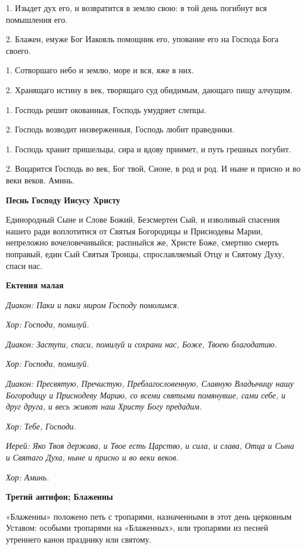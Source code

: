 1. Изыдет дух его, и возвратится в землю свою: в той день погибнут вся помышления его. 


2. Блажен, емуже Бог Иаковль помощник его, упование его на Господа Бога своего. 


1. Сотворшаго небо и землю, море и вся, яже в них. 


2. Хранящаго истину в век, творящаго суд обидимым, дающаго пищу алчущим. 


1. Господь решит окованныя, Господь умудряет слепцы. 


2. Господь возводит низверженныя, Господь любит праведники. 


1. Господь хранит пришельцы, сира и вдову приимет, и путь грешных погубит. 


2. Воцарится Господь во век, Бог твой, Сионе, в род и род. И ныне и присно и во веки веков. Аминь. 


\medskip
\bfseries Песнь Господу Иисусу Христу \normalfont{}


Единородный Сыне и Слове Божий, Безсмертен Сый, и изволивый спасения нашего ради воплотитися от Святыя Богородицы и Приснодевы Марии, непреложно вочеловечивыйся; распныйся же, Христе Боже, смертию смерть поправый, един Сый Святыя Троицы, спрославляемый Отцу и Святому Духу, спаси нас. 


\medskip
\bfseries Ектения малая \normalfont{}


\itshape Диакон:\normalfont{} Паки и паки миром Господу помолимся. 


\itshape Хор:\normalfont{} Господи, помилуй. 


\itshape Диакон:\normalfont{} Заступи, спаси, помилуй и сохрани нас, Боже, Твоею благодатию. 


\itshape Хор:\normalfont{} Господи, помилуй. 


\itshape Диакон:\normalfont{} Пресвятую, Пречистую, Преблагословенную, Славную Владычицу нашу Богородицу и Приснодеву Марию, со всеми святыми помянувше, сами себе, и друг друга, и весь живот наш Христу Богу предадим.


\itshape Хор:\normalfont{} Тебе, Господи. 


\itshape Иерей:\normalfont{} Яко Твоя держава, и Твое есть Царство, и сила, и слава, Отца и Сына и Святаго Духа, ныне и присно и во веки веков. 


\itshape Хор:\normalfont{} Аминь.


\medskip
\bfseries Третий антифон; Блаженны \normalfont{}


«Блаженны» положено петь с тропарями, назначенными в этот день церковным Уставом: особыми тропарями на «Блаженных», или тропарями из песней утреннего канон празднику или святому.


